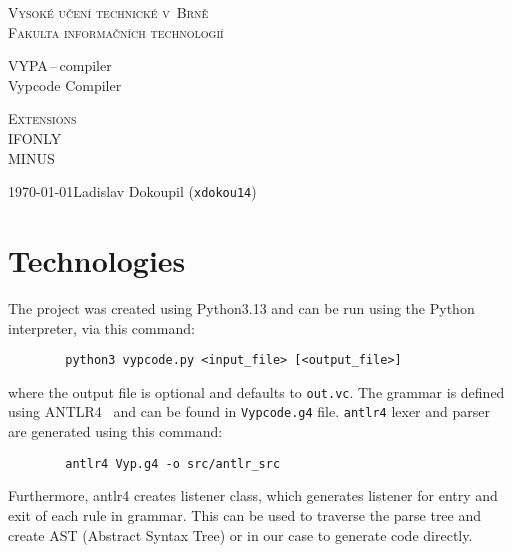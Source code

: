 \documentclass[a4paper,11pt]{article}
\begin{document}
	\begin{titlepage}
		\begin{center}
			\textsc{\Huge Vysoké učení technické v~Brně\\
				\vspace{0.4em}\huge Fakulta informačních technologií}


			{\LARGE VYPA\,--\,compiler\\
				\Huge Vypcode Compiler\\ \vspace{0.3em}}


			\textsc{{\LARGE Extensions}\\
				\vspace{0.4em} IFONLY \\
                    \vspace{0.4em} MINUS}



			{\Large \today \hfill Ladislav Dokoupil (\texttt{xdokou14})}
		\end{center}
	\end{titlepage}

    \section{Technologies}
    The project was created using Python3.13 and can be run using the Python interpreter, via this command:
    \begin{verbatim}
        python3 vypcode.py <input_file> [<output_file>]
    \end{verbatim}
    where the output file is optional and defaults to \texttt{out.vc}.
    The grammar is defined using ANTLR4~\cite{antlr} and can be found in \texttt{Vypcode.g4} file.
    \texttt{antlr4} lexer and parser are generated using this command:
    \begin{verbatim}
        antlr4 Vyp.g4 -o src/antlr_src
    \end{verbatim}
    Furthermore, antlr4 creates listener class, which generates listener for entry and exit of each rule in grammar.
    This can be used to traverse the parse tree and create AST (Abstract Syntax Tree) or in our case to generate code directly.
\end{document}
